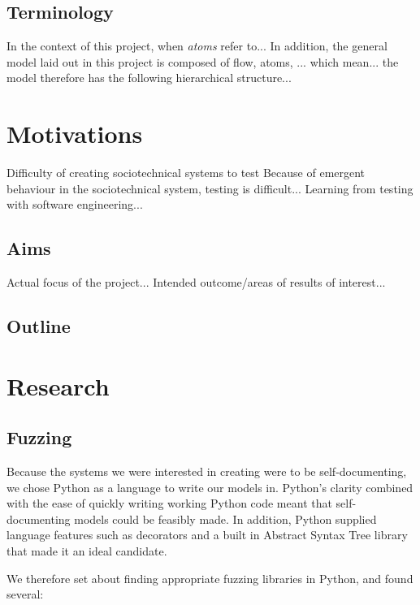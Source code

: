 \documentclass[a4paper]{l4proj}
\begin{document}
\begin{itemize}
\section{Terminology}
\label{introducing_technology}
In the context of this project, when \emph{atoms} refer to...
In addition, the general model laid out in this project is composed of flow, atoms, ... which mean... the model therefore has the following hierarchical structure...

\chapter{Motivations}
\label{motivations}
Difficulty of creating sociotechnical systems to test
Because of emergent behaviour in the sociotechnical system, testing is difficult...
Learning from testing with software engineering...


\section{Aims}
\label{aims}
Actual focus of the project...
Intended outcome/areas of results of interest...


\section{Outline}
\label{outline}


\chapter{Research}
\label{research_head}
\section{Fuzzing}
\label{research_fuzzing}
Because the systems we were interested in creating were to be self-documenting, we chose Python as a language to write our models in. Python's clarity combined with the ease of quickly writing working Python code meant that self-documenting models could be feasibly made. In addition, Python supplied language features such as decorators and a built in Abstract Syntax Tree library that made it an ideal candidate. \par
We therefore set about finding appropriate fuzzing libraries in Python, and found several:

\end{itemize}
\end{document}
